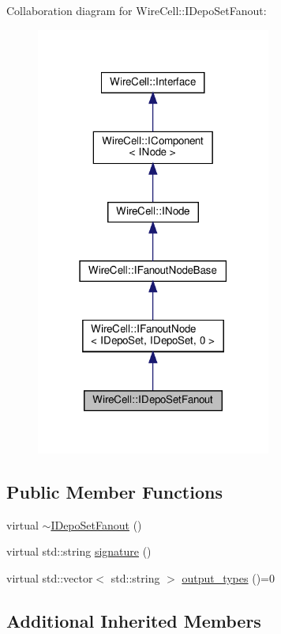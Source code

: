 Collaboration diagram for Wire\+Cell\+:\+:I\+Depo\+Set\+Fanout\+:
\nopagebreak
\begin{figure}[H]
\begin{center}
\leavevmode
\includegraphics[width=219pt]{class_wire_cell_1_1_i_depo_set_fanout__coll__graph}
\end{center}
\end{figure}
\subsection*{Public Member Functions}
\begin{DoxyCompactItemize}
\item 
virtual \hyperlink{class_wire_cell_1_1_i_depo_set_fanout_a765d481b1611f9916ef96af93256892f}{$\sim$\+I\+Depo\+Set\+Fanout} ()
\item 
virtual std\+::string \hyperlink{class_wire_cell_1_1_i_depo_set_fanout_a7cf17fc3925de7224c8c8472e09f689e}{signature} ()
\item 
virtual std\+::vector$<$ std\+::string $>$ \hyperlink{class_wire_cell_1_1_i_depo_set_fanout_a90833e933801d4152272189dc6ba1e38}{output\+\_\+types} ()=0
\end{DoxyCompactItemize}
\subsection*{Additional Inherited Members}


